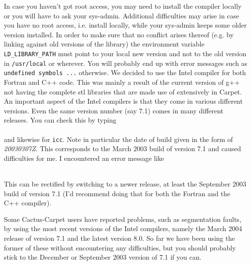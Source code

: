 \documentclass[11pt]{article}
\numberwithin{equation}{section}
\begin{document}
In case you haven't got root access,
you may need to install the compiler locally or you will have to ask your
sys-admin. Additional difficulties may arise in case you have no
root access, i.e. install locally, while your sys-admin keeps
some older version installed. In order to make sure that no conflict
arises thereof (e.g. by linking against old versions of the library)
the environment variable {\tt LD\_LIBRARY\_PATH} must point to your local
new version and not to the old version in {\tt /usr/local} or wherever.
You will probably end up with error messages such as
{\tt undefined symbols ...} otherwise. We decided to use the Intel compiler
for both Fortran and C++ code. This was mainly a result of the current
version of g++ not having the complete stl libraries that are made use of
extensively in Carpet. \\
An important aspect of the Intel compilers is that they come in various
different versions. Even the same version number (say 7.1) comes in many
different releases. You can check this by typing \\

\hspace{1cm}{\tt ifc -V}\\

and likewise for {\tt icc}. Note in particular the date of build given in the
form of {\em 20030307Z}. This corresponds to the March 2003 build of
version 7.1 and caused difficulties for me. I encountered an error message
like\\

\hspace{1cm}{\tt /home/terminator/sperhake/src/2004\_02\_16\_cactus-FMR/configs/test01/build/CarpetLib/}

\hspace{1cm}{\tt data.cc(173): error: no instance of overloaded function "dist::datatype"}

\hspace{1cm}{\tt matches the argument list}\\

This can be rectified by switching to a newer release, at least the
September 2003 build of version 7.1 (I'd recommend doing that for both
the Fortran and the C++ compiler).

Some Cactus-Carpet users have reported problems, such as segmentation faults,
by using the most recent versions of the Intel compilers, namely the March
2004 release of version 7.1 and the latest version 8.0. So far we have
been using the former of these without encountering any difficulties,
but you should probably stick to the December or September 2003 version
of 7.1 if you can.
\end{document}
